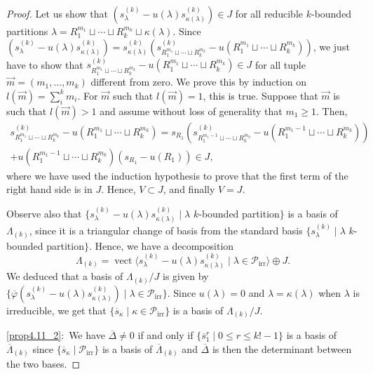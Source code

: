 \documentclass[10pt,a4paper]{amsart}
\theoremstyle{definition}
\DeclareMathOperator{\irr}{irr}
\DeclareMathOperator{\vect}{vect}
\begin{document}
\begin{proof}
Let us show that $(s_{\lambda}^{(k)}-u(\lambda)s_{\kappa(\lambda)}^{(k)})\in J$ for all reducible $k$-bounded partitions $\lambda=R_{1}^{m_{1}}%
\sqcup\cdots\sqcup R_{k}^{m_{k}}\sqcup\kappa(\lambda)$. Since $(s_{\lambda}^{(k)}-u(\lambda)s_{\kappa(\lambda)}^{(k)})=s_{\kappa(\lambda)}^{(k)}(s_{R_{1}^{m_{1}}%
\sqcup\cdots\sqcup R_{k}^{m_{k}}}^{(k)}-u(R_{1}^{m_{1}}%
\sqcup\cdots\sqcup R_{k}^{m_{k}}))$, we just have to show that $s_{R_{1}^{m_{1}}%
\sqcup\cdots\sqcup R_{k}^{m_{k}}}^{(k)}-u(R_{1}^{m_{1}}%
\sqcup\cdots\sqcup R_{k}^{m_{k}})\in J$ for all tuple $\vec{m}=(m_{1},\ldots,m_{k})$ different from zero. We prove this by induction on $l(\vec{m})=\sum_{i}^k m_{i}$. For $\vec{m}$ such that $l(\vec{m})=1$, this is true. Suppose that $\vec{m}$ is such that $l(\vec{m})>1$ and assume without loss of generality that $m_{1}\geq 1$. Then,
\begin{multline*}
s_{R_{1}^{m_{1}}%
\sqcup\cdots\sqcup R_{k}^{m_{k}}}^{(k)} -u(R_{1}^{m_{1}}%
\sqcup\cdots\sqcup R_{k}^{m_{k}})=s_{R_{1}} (s_{R_{1}^{m_{1}-1}%
\sqcup\cdots\sqcup R_{k}^{m_{k}}}^{(k)} -u(R_{1}^{m_{1}-1}%
\sqcup\cdots\sqcup R_{k}^{m_{k}}))\\
+u(R_{1}^{m_{1}-1}%
\sqcup\cdots\sqcup R_{k}^{m_{k}})(s_{R_{1}}-u(R_{1}))\in J,
\end{multline*}
where we have used the induction hypothesis to prove that the first term of the right hand side is in $J$. Hence, $V\subset J$, and finally $V=J$.

Observe also that $\{s_{\lambda}^{(k)}-u(\lambda)s_{\kappa(\lambda)}^{(k)}\mid\lambda$ $k$-bounded partition$\}$ is a basis of $\Lambda_{(k)}$, since it is a triangular change of basis from the standard basis $\{ s_{\lambda}^{(k)}\mid \lambda$ $k$-bounded partition$\}$. Hence, we have a decomposition 
\[
\Lambda_{(k)}=\vect \langle s_{\lambda}^{(k)}-u(\lambda)s_{\kappa(\lambda)}^{(k)}\mid\lambda\in \mathcal{P}_{\irr }\rangle\oplus J.
\]
We deduced that a basis of $\Lambda_{(k)}/J$ is given by $\{ \overline{\varphi}(s_{\lambda}^{(k)}-u(\lambda)s_{\kappa(\lambda)}^{(k)})\mid\lambda\in\mathcal{P}_{\irr }\}$. Since $u(\lambda)=0$ and $\lambda=\kappa(\lambda)$ when $\lambda$ is irreducible, we get that $\{ \overline{s}_{\kappa}\mid\kappa\in\mathcal{P}_{\irr }\}$ is a basis of $\Lambda_{(k)}/J$.

\eqref{prop4.11_2}:~We have $\overline{\Delta}\neq0$ if and only if $\{\overline{s}_{1}^{r}%
\mid0\leq r\leq k!-1\}$ is a basis of $\overline{\Lambda}_{(k)}$ since
$\{\overline{s}_{\kappa}\mid\mathcal{P}_{\irr }\}$ is a basis of
$\overline{\Lambda}_{(k)}$ and $\overline{\Delta}$ is then the determinant
between the two bases.
\end{proof}
\end{document}
